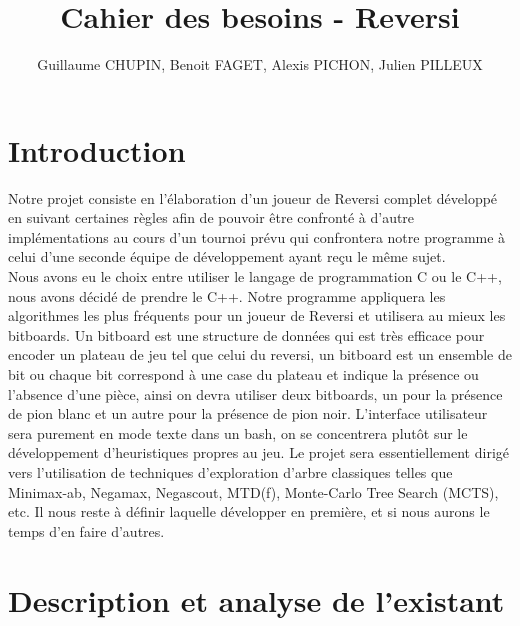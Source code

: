 \documentclass[10pt,a4paper]{article}
\title{Cahier des besoins - Reversi}
\author{Guillaume CHUPIN, Benoit FAGET, Alexis PICHON, Julien PILLEUX}
\begin{document}
\maketitle
\newpage
\tableofcontents
\newpage

\section{Introduction}

Notre projet consiste en l'élaboration d'un joueur de Reversi complet développé en suivant certaines règles afin de pouvoir être confronté à d'autre implémentations au cours d'un tournoi prévu qui confrontera notre programme à celui d'une seconde équipe de développement ayant reçu le même sujet.\\

Nous avons eu le choix entre utiliser le langage de programmation C ou le C++, nous avons décidé de prendre le C++. Notre programme appliquera les algorithmes les plus fréquents pour un joueur de Reversi et utilisera au mieux les bitboards. Un bitboard est une structure de données qui est très efficace pour encoder un plateau de jeu tel que celui du reversi, un bitboard est un ensemble de bit ou chaque bit correspond à une case du plateau et indique la présence ou l'absence d'une pièce, ainsi on devra utiliser deux bitboards, un pour la présence de pion blanc et un autre pour la présence de pion noir. L'interface utilisateur sera purement en mode texte dans un bash, on se concentrera plutôt sur le développement d'heuristiques propres au jeu. Le projet sera essentiellement dirigé vers l'utilisation de techniques d'exploration d'arbre classiques telles que Minimax-ab, Negamax, Negascout, MTD(f), Monte-Carlo Tree Search (MCTS), etc. Il nous reste à définir laquelle développer en première, et si nous aurons le temps d'en faire d'autres.

\section{Description et analyse de l'existant}
\end{document}
